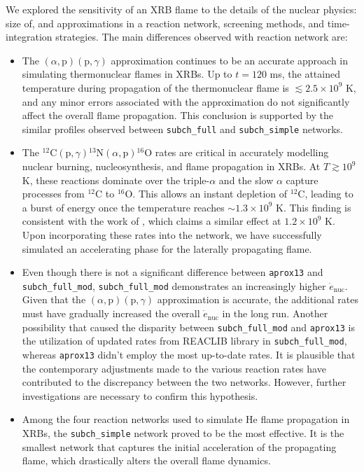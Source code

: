 \documentclass[preprint,times,tighten,linenumbers]{aastex631}
\begin{document}
We explored the sensitivity of an XRB flame to the details of the
nuclear physics: size of, and approximations in a reaction network, screening methods, and time-integration strategies. The main
differences observed with reaction network are:

\begin{itemize}
    \item The $(\alpha, \mbox{p})(\mbox{p}, \gamma)$ approximation continues to be an accurate approach in simulating thermonuclear flames in XRBs. Up to $t = 120$ ms, the attained temperature during propagation of the thermonuclear flame is $\lesssim 2.5 \times 10^9$ K, and any minor errors associated with the approximation do not significantly affect the overall flame propagation. This conclusion is supported by the similar profiles observed between {\tt subch\_full} and {\tt subch\_simple} networks.
    
    \item The ${}^{12}\mbox{C}(\mbox{p}, \gamma) {}^{13}\mbox{N}(\alpha, \mbox{p}){}^{16}\mbox{O}$ rates are critical in accurately modelling nuclear burning, nucleosynthesis, and flame propagation in XRBs. At $T \gtrsim 10^9$ K, these reactions dominate over the triple-$\alpha$ and the slow $\alpha$ capture processes from ${}^{12}$C to ${}^{16}$O. This allows an instant depletion of ${}^{12}$C, leading to a burst of energy once the temperature reaches $\sim 1.3 \times 10^9$ K. This finding is consistent with the work of \cite{Weinberg_2006}, which claims a similar effect at $1.2 \times 10^9$ K. Upon incorporating these rates into the network, we have successfully simulated an accelerating phase for the laterally propagating flame.

    \item Even though there is not a significant difference between {\tt aprox13} and {\tt subch\_full\_mod}, {\tt subch\_full\_mod} demonstrates an increasingly higher $\dot{e}_{\textrm{nuc}}$. Given that the $(\alpha, \mbox{p})(\mbox{p}, \gamma)$ approximation is accurate, the additional rates must have gradually increased the overall $\dot{e}_{\textrm{nuc}}$ in the long run.
    Another possibility that caused the disparity between {\tt subch\_full\_mod} and {\tt aprox13} is the utilization of updated rates from {\sf REACLIB} library in {\tt subch\_full\_mod}, whereas {\tt aprox13} didn't employ the most up-to-date rates. It is plausible that the contemporary adjustments made to the various reaction rates have contributed to the discrepancy between the two networks. However, further investigations are necessary to confirm this hypothesis.

    \item  Among the four reaction networks used to simulate He flame propagation in XRBs, the {\tt subch\_simple} network proved to be the most effective. It is the smallest network that captures the initial acceleration of the propagating flame, which drastically alters the overall flame dynamics.
    
\end{itemize}
\end{document}
